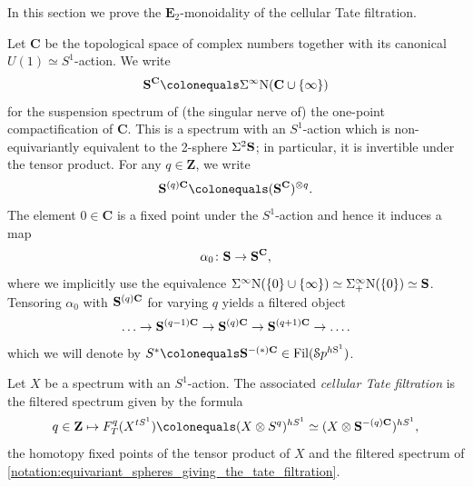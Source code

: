 \documentclass[oneside,a4paper]{amsart}
\begin{document}
In this section we prove the $\mathbf{E}_{2}$-monoidality of the cellular Tate filtration. 

\begin{notation}
\label{notation:equivariant_spheres_giving_the_tate_filtration}
Let $\mathbf{C}$ be the topological space of complex numbers together with its canonical $U(1) \simeq S^{1}$-action. We write 
\[
\thesphere^{\mathbf{C}} \colonequals \Sigma^{\infty} \mathrm{N}(\mathbf{C} \cup \{ \infty \})
\]
for the suspension spectrum of (the singular nerve of) the one-point compactification of $\mathbf{C}$. This is a spectrum with an $S^{1}$-action which is non-equivariantly equivalent to the 2-sphere $\Sigma^{2} \mathbf{S}$; in particular, it is invertible under the tensor product. For any $q \in \mathbf{Z}$, we write 
\[
\thesphere^{(q) \mathbf{C}} \colonequals (\thesphere^{\mathbf{C}})^{\otimes q}. 
\]
The element $0 \in \mathbf{C}$ is a fixed point under the $S^{1}$-action and hence it induces a map
\[
\alpha_{0} \colon \mathbf{S} \rightarrow \mathbf{S}^{\mathbf{C}},
\]
where we implicitly use the equivalence $\Sigma^{\infty} \mathrm{N}(\{ 0 \} \cup \{ \infty \}) \simeq \Sigma^{\infty}_{+} \mathrm{N}(\{ 0 \}) \simeq \mathbf{S}$. Tensoring $\alpha_{0}$ with $\mathbf{S}^{(q)\mathbf{C}}$ for varying $q$ yields a filtered object 
\[
\ldots \rightarrow \mathbf{S}^{(q-1)\mathbf{C}} \rightarrow \mathbf{S}^{(q)\mathbf{C}} \rightarrow \mathbf{S}^{(q+1)\mathbf{C}} \rightarrow \ldots. 
\] 
which we will denote by $S^{\ast} \colonequals \thesphere^{-(\ast)\mathbf{C}} \in \Fil(\spectra^{h \mathrm{S^{1}}})$. 
\end{notation}

\begin{definition}
\label{definition:cellular_tate_filtration}
Let $X$ be a spectrum with an $S^{1}$-action. The associated \emph{cellular Tate filtration} is the filtered spectrum given by the formula
\[
q \in \ZZ \mapsto F^{q}_{T}(X^{tS^{1}}) \colonequals (X \otimes S^{q})^{hS^{1}} \simeq (X \otimes \thesphere^{-(q)\mathbf{C}})^{hS^{1}},  
\]
the homotopy fixed points of the tensor product of $X$ and the filtered spectrum of \cref{notation:equivariant_spheres_giving_the_tate_filtration}. 
\end{definition}
\end{document}
